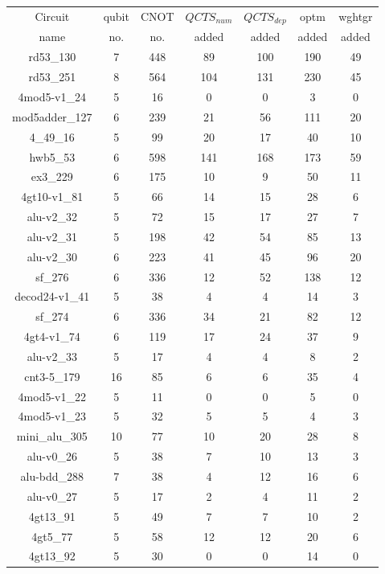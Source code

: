 \documentclass[runningheads]{llncs}
\begin{document}
	\begin{table}[H]
		\begin{center}  
		\begin{tabular}{|c|c|c|c|c|c|c|}
		\hline
		Circuit &  qubit  & CNOT &$QCTS_{num}$& $QCTS_{dep}$  & optm 	 & wghtgr 	\\
		 name	&   no. 	&	no. & added&  added &  added 	&  added\\
		\hline
		rd53\_130 & 7 & 448 & 89 & 100 & 190 & 49 \\ 
rd53\_251 & 8 & 564 & 104 & 131 & 230 & 45 \\ 
4mod5-v1\_24 & 5 & 16 & 0 & 0 & 3 & 0 \\ 
mod5adder\_127 & 6 & 239 & 21 & 56 & 111 & 20 \\ 
4\_49\_16 & 5 & 99 & 20 & 17 & 40 & 10 \\ 
hwb5\_53 & 6 & 598 & 141 & 168 & 173 & 59 \\ 
ex3\_229 & 6 & 175 & 10 & 9 & 50 & 11 \\ 
4gt10-v1\_81 & 5 & 66 & 14 & 15 & 28 & 6 \\ 
alu-v2\_32 & 5 & 72 & 15 & 17 & 27 & 7 \\ 
alu-v2\_31 & 5 & 198 & 42 & 54 & 85 & 13 \\ 
alu-v2\_30 & 6 & 223 & 41 & 45 & 96 & 20 \\ 
sf\_276 & 6 & 336 & 12 & 52 & 138 & 12 \\ 
decod24-v1\_41 & 5 & 38 & 4 & 4 & 14 & 3 \\ 
sf\_274 & 6 & 336 & 34 & 21 & 82 & 12 \\ 
4gt4-v1\_74 & 6 & 119 & 17 & 24 & 37 & 9 \\ 
alu-v2\_33 & 5 & 17 & 4 & 4 & 8 & 2 \\ 
cnt3-5\_179 & 16 & 85 & 6 & 6 & 35 & 4 \\ 
4mod5-v1\_22 & 5 & 11 & 0 & 0 & 5 & 0 \\ 
4mod5-v1\_23 & 5 & 32 & 5 & 5 & 4 & 3 \\ 
mini\_alu\_305 & 10 & 77 & 10 & 20 & 28 & 8 \\ 
alu-v0\_26 & 5 & 38 & 7 & 10 & 13 & 3 \\ 
alu-bdd\_288 & 7 & 38 & 4 & 12 & 16 & 6 \\ 
alu-v0\_27 & 5 & 17 & 2 & 4 & 11 & 2 \\ 
4gt13\_91 & 5 & 49 & 7 & 7 & 10 & 2 \\ 
4gt5\_77 & 5 & 58 & 12 & 12 & 20 & 6 \\ 
4gt13\_92 & 5 & 30 & 0 & 0 & 14 & 0 \\ 

\end{tabular}
\end{center}
\end{table}
\end{document}

